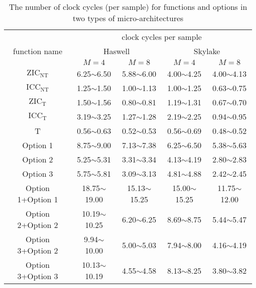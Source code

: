 \begin{table}[t]
    \caption{The number of clock cycles (per sample) for functions and options in two types of micro-architectures}  %
    \centering %
    \setlength{\tabcolsep}{1.6pt}
    \begin{tabular}{c|c|c|c|c} %
    \hline\hline %
     & \multicolumn{4}{c}{clock cycles per sample} \\ [0.3ex]
    \cline{2-5}
    function name & \multicolumn{2}{c|}{Haswell} & \multicolumn{2}{c}{Skylake} \\ [0.3ex]
    \cline{2-5}
     & $M{=}4$ & $M{=}8$ & $M{=}4$ & $M{=}8$ \\ [0.3ex] %
    \hline
    $\text{ZIC}_{\text{NT}}$ & 6.25$\sim$6.50 & 5.88$\sim$6.00 & 4.00$\sim$4.25 & 4.00$\sim$4.13 \\ [0.3ex]
    $\text{ICC}_{\text{NT}}$ & 1.25$\sim$1.50 & 1.00$\sim$1.13 & 1.00$\sim$1.25 & 0.63$\sim$0.75 \\ [0.3ex]
    $\text{ZIC}_{\text{T}}$ & 1.50$\sim$1.56 & 0.80$\sim$0.81 & 1.19$\sim$1.31 & 0.67$\sim$0.70 \\ [0.3ex]
    $\text{ICC}_{\text{T}}$ & 3.19$\sim$3.25 & 1.27$\sim$1.28 & 2.19$\sim$2.25 & 0.94$\sim$0.95 \\ [0.3ex]
    T & 0.56$\sim$0.63 & 0.52$\sim$0.53 & 0.56$\sim$0.69 & 0.48$\sim$0.52 \\ [0.3ex]
    Option 1 & 8.75$\sim$9.00 & 7.13$\sim$7.38 & 6.25$\sim$6.50 & 5.38$\sim$5.63 \\ [0.3ex]
    Option 2 & 5.25$\sim$5.31 & 3.31$\sim$3.34 & 4.13$\sim$4.19 & 2.80$\sim$2.83 \\ [0.3ex]
    Option 3 & 5.75$\sim$5.81 & 3.09$\sim$3.13 & 4.81$\sim$4.88 & 2.42$\sim$2.45 \\ [0.3ex]
    Option 1+Option 1 & 18.75$\sim$19.00 & 15.13$\sim$15.25 & 15.00$\sim$15.25 & 11.75$\sim$12.00 \\ [0.3ex]
    Option 2+Option 2 & 10.19$\sim$10.25 & 6.20$\sim$6.25 & 8.69$\sim$8.75 & 5.44$\sim$5.47 \\ [0.3ex]
    Option 3+Option 2 & 9.94$\sim$10.00 & 5.00$\sim$5.03 & 7.94$\sim$8.00 & 4.16$\sim$4.19 \\ [0.3ex]
    Option 3+Option 3 & 10.13$\sim$10.19 & 4.55$\sim$4.58 & 8.13$\sim$8.25 & 3.80$\sim$3.82 \\ [1ex]
    \hline
    \end{tabular}
    \label{table:number_of_instructions_in_clock_cycles} %
\end{table}

